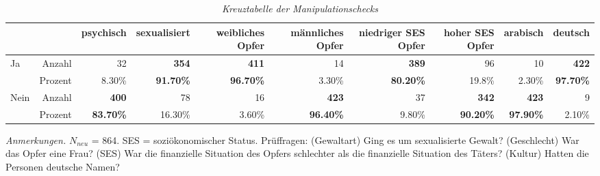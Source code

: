 \begin{table}[htb]
    \caption[Kreuztabelle Manipulationscheck]{\textit {Kreuztabelle der Manipulationschecks}} 
    \label{Kreuztabelle}
    \centering
    \begin{adjustbox}{width=\textwidth}
    \small
    \begin{tabular}{lrrrrrrrrr}
      \hline
        &   & psychisch & sexualisiert & weibliches Opfer & männliches Opfer & niedriger SES Opfer & hoher SES Opfer & arabisch & deutsch \\
      \hline
    Ja   & Anzahl  & 32      & \textbf{354}     & \textbf{411}      & 14      & \textbf{389}      & 96      & 10      & \textbf{422}      \\
         & Prozent & 8.30\%  & \textbf{91.70\%} & \textbf{96.70\%}  & 3.30\%  & \textbf{80.20\%}  & 19.8\%  & 2.30\%  & \textbf{97.70\%}  \\
    Nein & Anzahl  & \textbf{400}     & 78      & 16       & \textbf{423}     & 37       & \textbf{342}     & \textbf{423}     & 9        \\
         & Prozent & \textbf{83.70\%} & 16.30\% & 3.60\%   & \textbf{96.40\%} & 9.80\%   & \textbf{90.20\%} & \textbf{97.90\%} & 2.10\%   \\
       \hline
    \end{tabular}
    \end{adjustbox}
    
    \begin{tablenotes}
        \item \textit{Anmerkungen.} \( N_{neu} \) = 864. SES = soziökonomischer Status. Prüffragen: (Gewaltart) Ging es um sexualisierte Gewalt? (Geschlecht) War das Opfer eine Frau? (SES) War die finanzielle Situation des Opfers schlechter als die finanzielle Situation des Täters? (Kultur) Hatten die Personen deutsche Namen?
      \end{tablenotes}
    \end{table}

    